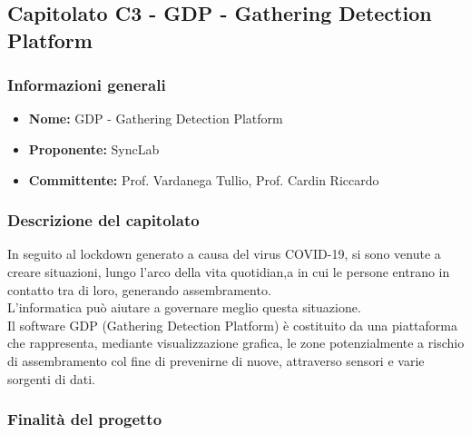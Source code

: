 \subsection{Capitolato C3 - GDP - Gathering Detection Platform}


\subsubsection{Informazioni generali}

\begin{itemize}
	\item{\textbf{Nome:}} GDP - Gathering Detection Platform
	\item{\textbf{Proponente:}} SyncLab
	\item{\textbf{Committente:}} Prof. Vardanega Tullio, Prof. Cardin Riccardo
\end{itemize}



\subsubsection{Descrizione del capitolato}
In seguito al lockdown generato a causa del virus COVID-19, si sono venute a creare situazioni, lungo l'arco della vita quotidian,a in cui le persone entrano in contatto tra di loro, generando assembramento.\\
L’informatica può aiutare a governare meglio questa situazione.\\
Il software GDP (Gathering Detection Platform) è costituito da una piattaforma che rappresenta, mediante visualizzazione grafica, le zone potenzialmente a rischio di assembramento col fine di prevenirne di nuove, attraverso sensori e varie sorgenti di dati.\\


\subsubsection{Finalità del progetto}

